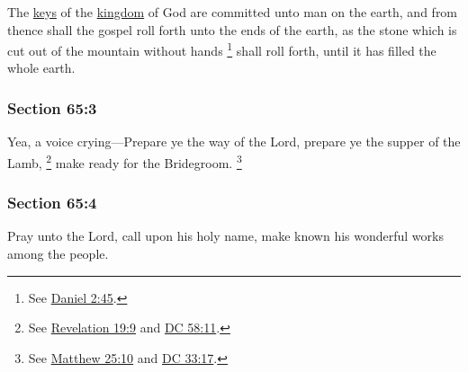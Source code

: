 		The \hyperref[KEY]{keys} of the \hyperref[KINGDOM]{kingdom} of God are committed unto man on the earth, and from thence shall the gospel roll forth unto the ends of the earth, as the stone which is cut out of the mountain without hands%
			\footnote{%
				See \hyperref[DANIEL-2-45]{Daniel 2:45}.
				}
		shall roll forth, until it has filled the whole earth.


	\subsubsection{Section 65:3} %
		\label{DC65-3}

		Yea, a voice crying---Prepare ye the way of the Lord, prepare ye the supper of the Lamb,%
			\footnote{%
				See \hyperref[REVELATIONNT-19-9]{Revelation 19:9} and \hyperref[DC58-11]{DC 58:11}.
				}
		make ready for the Bridegroom.%
			\footnote{%
				See \hyperref[MATTHEW-25-10]{Matthew 25:10} and \hyperref[DC33-17]{DC 33:17}.
				}


	\subsubsection{Section 65:4} %
		\label{DC65-4}

		Pray unto the Lord, call upon his holy name, make known his wonderful works among the people.


